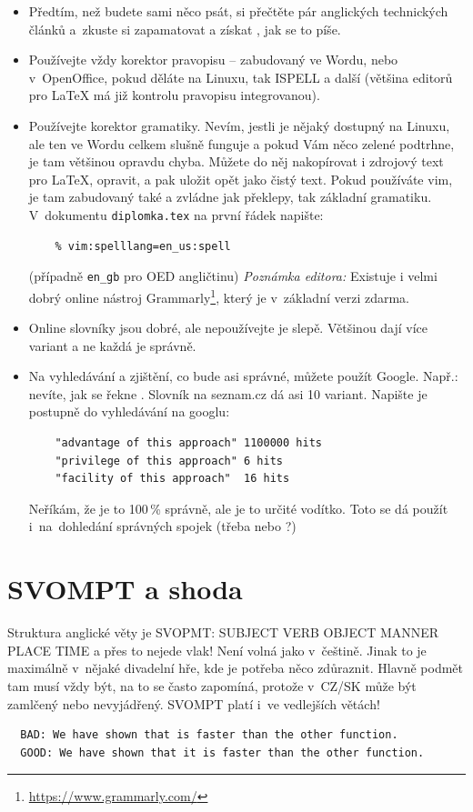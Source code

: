 \begin{itemize}
  \item{Předtím, než budete sami něco psát, si přečtěte pár anglických technických článků a~zkuste si zapamatovat a získat , jak se to píše.}
  \item{Používejte vždy korektor pravopisu -- zabudovaný ve Wordu, nebo v~OpenOffice, pokud děláte na Linuxu, tak ISPELL a další (většina editorů pro \LaTeX{} má již kontrolu pravopisu integrovanou).}
  \item{Používejte korektor gramatiky. Nevím, jestli je nějaký dostupný na Linuxu, ale ten ve Wordu celkem slušně funguje a pokud Vám něco zelené podtrhne, je tam většinou opravdu chyba. Můžete do něj nakopírovat i zdrojový text pro \LaTeX{}, opravit, a pak uložit opět jako čistý text. Pokud používáte vim, je tam zabudovaný také a zvládne jak překlepy, tak základní gramatiku. V~dokumentu \texttt{diplomka.tex} na první řádek napište: 
  \begin{verbatim}
    % vim:spelllang=en_us:spell
  \end{verbatim}
  (případně \texttt{en\_gb} pro OED angličtinu)
  \textit{Poznámka editora:} Existuje i velmi dobrý online nástroj Grammarly\footnote{\url{https://www.grammarly.com/}}, který je v~základní verzi zdarma. 
  }
  \item{Online slovníky jsou dobré, ale nepoužívejte je slepě. Většinou dají více variant a ne každá je správně.}
  \item{\begin{samepage}Na vyhledávání a zjištění, co bude asi správné, můžete použít Google. Např.: nevíte, jak se řekne . Slovník na seznam.cz dá asi 10 variant. Napište je postupně do vyhledávání na googlu:
  \begin{verbatim}
    "advantage of this approach" 1100000 hits
    "privilege of this approach" 6 hits
    "facility of this approach"  16 hits
  \end{verbatim}
  Neříkám, že je to 100\,\% správně, ale je to určité vodítko. Toto se dá použít i~na~dohledání správných spojek (třeba  nebo ?)\end{samepage}}
\end{itemize}
       
\section*{SVOMPT a shoda}

Struktura anglické věty je SVOPMT: SUBJECT VERB OBJECT MANNER PLACE TIME a přes to nejede vlak! Není volná jako v~češtině. Jinak to je maximálně v~nějaké divadelní hře, kde je potřeba něco zdůraznit. Hlavně podmět tam musí vždy být, na to se často zapomíná, protože v~CZ/SK může být zamlčený nebo nevyjádřený. SVOMPT platí i~ve vedlejších větách!
\begin{verbatim}
  BAD: We have shown that is faster than the other function. 
  GOOD: We have shown that it is faster than the other function. 
\end{verbatim}

